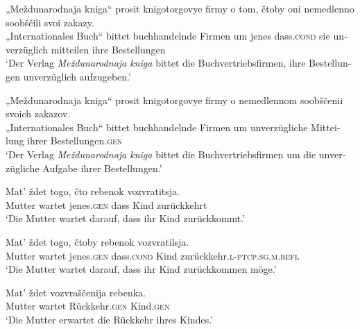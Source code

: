 \documentclass[output=paper]{langscibook}
\begin{document}
\begin{otherlanguage}{german}
\ea \label{ex:zi83:21}
    \ea \label{ex:zi83:21a}
        \gll „Meždunarodnaja kniga“ prosit knigotorgovye firmy o tom, čtoby oni nemedlenno soobščili svoi zakazy. \\
         „Internationales Buch“ bittet  buchhandelnde Firmen um jenes dass.\textsc{cond} sie unverzüglich mitteilen ihre Bestellungen \\
         \glt ‘Der Verlag \textit{Meždunarodnaja kniga} bittet die Buchvertriebsfirmen, ihre Bestellungen unverzüglich aufzugeben.’
        
    \ex \label{ex:zi83:21b}
        \gll „Meždunarodnaja kniga“ prosit knigotorgovye firmy o nemedlennom soobščenii svoich zakazov. \\
         „Internationales Buch“ bittet buchhandelnde Firmen um unverzügliche Mitteilung ihrer Bestellungen.\textsc{gen} \\
         \glt ‘Der Verlag \textit{Meždunarodnaja kniga} bittet die Buchvertriebsfirmen um die unverzügliche Aufgabe ihrer Bestellungen.’
        
    \z
\ex \label{ex:zi83:22}
    \ea \label{ex:zi83:22a}
    \gll Mat’ ždet togo, čto rebenok vozvratitsja. \\
     Mutter wartet jenes.\textsc{gen} dass  Kind zurückkehrt \\
     \glt ‘Die Mutter wartet darauf, dass ihr Kind zurückkommt.’
    
    \ex \label{ex:zi83:22b}
    \gll Mat’ ždet togo, čtoby rebenok vozvratilsja. \\
    Mutter wartet jenes.\textsc{gen} dass.\textsc{cond}  Kind zurückkehr.\textsc{l-ptcp}.\textsc{sg}.\textsc{m}.\textsc{refl} \\
    \glt ‘Die Mutter wartet darauf, dass ihr Kind zurückkommen möge.’
    
    \ex \label{ex:zi83:22c}
    \gll Mat’ ždet vozvraščenija rebenka. \\
    Mutter wartet Rückkehr.\textsc{gen}  Kind.\textsc{gen} \\
    \glt ‘Die Mutter erwartet die Rückkehr ihres Kindes.’
    
    \z
\z


\end{otherlanguage}
\end{document}
